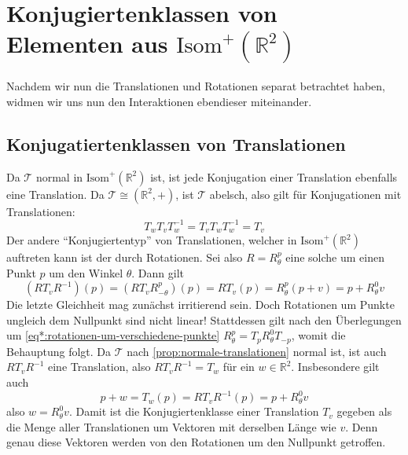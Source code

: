 \documentclass[a4paper, ngerman]{article}
\numberwithin{equation}{chapter}
\theoremstyle{plain}
\theoremstyle{definition}
\newcommand{\geradisometr}{\ensuremath{\mathrm{Isom}^+(\mathbb R^2)}}
\begin{document}
\section{Konjugiertenklassen von Elementen aus \(\geradisometr\)}\label{sec:konjugiertenklassen-gerader-isometrien}

Nachdem wir nun die Translationen und Rotationen separat betrachtet haben, widmen wir uns nun den Interaktionen ebendieser miteinander. 

\subsection{Konjugatiertenklassen von Translationen}\label{subsec:konjugiertenklassen-von-translationen}
Da \(\mathcal T\) normal in \(\geradisometr\) ist, ist jede Konjugation einer Translation ebenfalls eine Translation. Da \(\mathcal T \cong (\mathbb R^2, +)\), ist \(\mathcal T\) abelsch, also gilt für Konjugationen mit Translationen: 
\begin{equation*}
    T_w T_v T_w^{-1} = T_v T_w T_w^{-1} = T_v
\end{equation*}
Der andere "`Konjugiertentyp"' von Translationen, welcher in \(\geradisometr\) auftreten kann ist der durch Rotationen. Sei also \(R = R_\theta^p\) eine solche um einen Punkt \(p\) um den Winkel \(\theta\). Dann gilt 
\begin{equation*}
    (RT_vR^{-1})(p) = (RT_vR_{-\theta}^p)(p) = RT_v(p) = R_\theta^p (p+v) = p + R_\theta^0 v
\end{equation*}
Die letzte Gleichheit mag zunächst irritierend sein. Doch Rotationen um Punkte ungleich dem Nullpunkt sind nicht linear! Stattdessen gilt nach den Überlegungen um \eqref{eq*:rotationen-um-verschiedene-punkte} \(R_\theta^p = T_p R_\theta^0 T_{-p}\), womit die Behauptung folgt. Da \(\mathcal T\) nach \cref{prop:normale-translationen} normal ist, ist auch \(RT_vR^{-1}\) eine Translation, also \(RT_vR^{-1} = T_w\) für ein \(w \in \mathbb R^2\). Insbesondere gilt auch 
\begin{equation*}
    p + w = T_w(p) = RT_vR^{-1}(p) = p + R_\theta^0 v
\end{equation*}
also \(w = R_\theta^0 v\). Damit ist die Konjugiertenklasse einer Translation \(T_v\) gegeben als die Menge aller Translationen um Vektoren mit derselben Länge wie \(v\). Denn genau diese Vektoren werden von den Rotationen um den Nullpunkt getroffen. 
\end{document}
